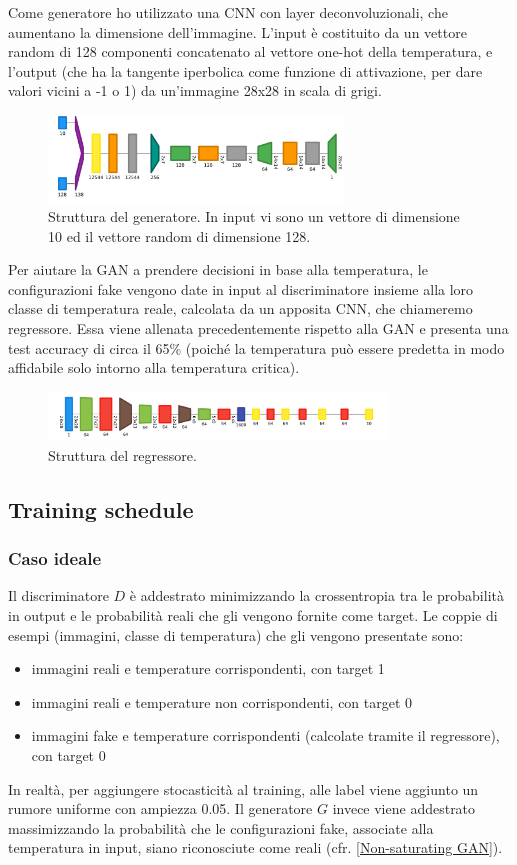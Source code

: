 \documentclass[a4paper]{article}
\begin{document}
Come generatore ho utilizzato una CNN con layer deconvoluzionali, che aumentano la dimensione dell'immagine. L'input è costituito da un vettore random di 128 componenti concatenato al vettore one-hot della temperatura, e l'output (che ha la tangente iperbolica come funzione di attivazione, per dare valori vicini a -1 o 1) da un'immagine 28x28 in scala di grigi.
\begin{figure}[H]
\includegraphics[width=0.7\textwidth]{gen.png}
\centering
\caption{Struttura del generatore. In input vi sono un vettore di dimensione 10 ed il vettore random di dimensione 128.}
\end{figure}
Per aiutare la GAN a prendere decisioni in base alla temperatura, le configurazioni fake vengono date in input al discriminatore insieme alla loro classe di temperatura reale, calcolata da un apposita CNN, che chiameremo regressore. Essa viene allenata precedentemente rispetto alla GAN e presenta una test accuracy di circa il 65\% (poiché la temperatura può essere predetta in modo affidabile solo intorno alla temperatura critica).
\begin{figure}[H]
\includegraphics[width=0.8\textwidth]{reg.png}
\centering
\caption{Struttura del regressore.}
\end{figure}
\subsection{Training schedule}
\subsubsection{Caso ideale}
\label{Caso ideale}
Il discriminatore $D$ è addestrato minimizzando la crossentropia tra le probabilità in output e le probabilità reali che gli vengono fornite come target. Le coppie di esempi (immagini, classe di temperatura) che gli vengono presentate sono:
\begin{itemize}
\item immagini reali e temperature corrispondenti, con target 1
\item immagini reali e temperature non corrispondenti, con target 0
\item immagini fake e temperature corrispondenti (calcolate tramite il regressore), con target 0
\end{itemize}
In realtà, per aggiungere stocasticità al training, alle label viene aggiunto un rumore uniforme con ampiezza 0.05.
Il generatore $G$ invece viene addestrato massimizzando la probabilità che le configurazioni fake, associate alla temperatura in input, siano riconosciute come reali (cfr. \ref{Non-saturating GAN}).
\end{document}
